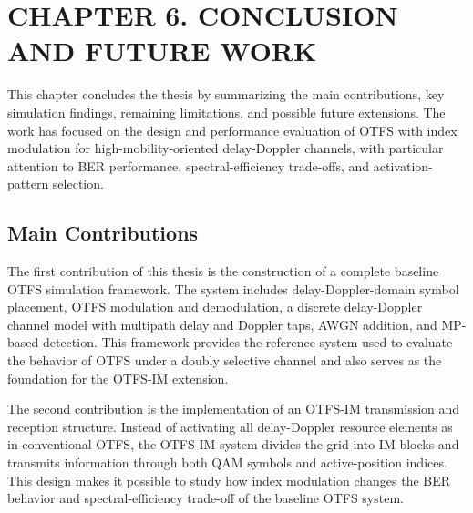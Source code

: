 \section*{CHAPTER 6. CONCLUSION AND FUTURE WORK}

\setcounter{section}{6}
\setcounter{subsection}{0}
\setcounter{subsubsection}{0}
\setcounter{figure}{0}
\setcounter{table}{0}
\setcounter{equation}{0}

\renewcommand{\thefigure}{6.\arabic{figure}}
\renewcommand{\thetable}{6.\arabic{table}}
\renewcommand{\theequation}{6.\arabic{equation}}
\renewcommand{\theHfigure}{6.\arabic{figure}}
\renewcommand{\theHtable}{6.\arabic{table}}
\renewcommand{\theHequation}{6.\arabic{equation}}

This chapter concludes the thesis by summarizing the main contributions, key simulation findings, remaining limitations, and possible future extensions. The work has focused on the design and performance evaluation of OTFS with index modulation for high-mobility-oriented delay-Doppler channels, with particular attention to BER performance, spectral-efficiency trade-offs, and activation-pattern selection.

\subsection{Main Contributions}

The first contribution of this thesis is the construction of a complete baseline OTFS simulation framework. The system includes delay-Doppler-domain symbol placement, OTFS modulation and demodulation, a discrete delay-Doppler channel model with multipath delay and Doppler taps, AWGN addition, and MP-based detection. This framework provides the reference system used to evaluate the behavior of OTFS under a doubly selective channel and also serves as the foundation for the OTFS-IM extension.

The second contribution is the implementation of an OTFS-IM transmission and reception structure. Instead of activating all delay-Doppler resource elements as in conventional OTFS, the OTFS-IM system divides the grid into IM blocks and transmits information through both QAM symbols and active-position indices. This design makes it possible to study how index modulation changes the BER behavior and spectral-efficiency trade-off of the baseline OTFS system.

